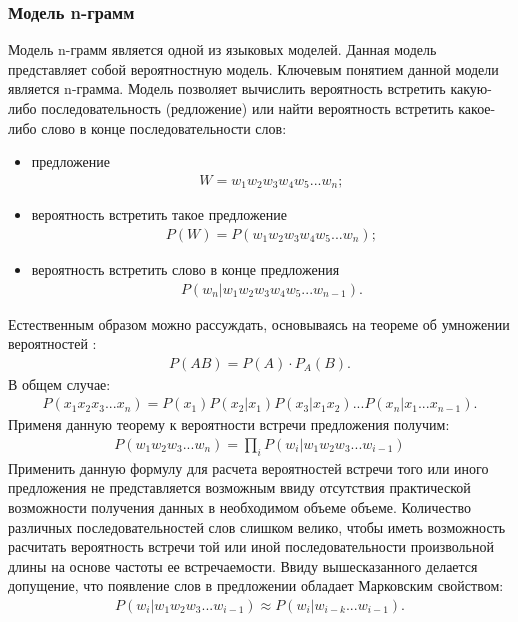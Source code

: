 \subsubsection{Модель n-грамм}
Модель n-грамм является одной из языковых моделей. Данная модель представляет собой вероятностную модель. Ключевым понятием данной модели является n-грамма. Модель позволяет вычислить вероятность встретить какую-либо последовательность (редложение) или найти вероятность встретить какое-либо слово в конце последовательности слов:
\begin{itemize}
	\item
	предложение
	\begin{align}
		W = w_1w_2w_3w_4w_5...w_n;
	\end{align}
	\item
	вероятность встретить такое предложение
	\begin{align}
		P(W) = P(w_1w_2w_3w_4w_5...w_n);
	\end{align}
	\item
	вероятность встретить слово в конце предложения
	\begin{align}
		P(w_n|w_1w_2w_3w_4w_5...w_{n-1}).
	\end{align}
\end{itemize}
Естественным образом можно рассуждать, основываясь на теореме об умножении вероятностей \cite{gmurman}:
\begin{align}
	P(AB) = P(A) \cdot P_A(B).
\end{align}
В общем случае:
\begin{align}
	P(x_1x_2x_3...x_n) = P(x_1)P(x_2|x_1)P(x_3|x_1x_2)...P(x_n|x_1...x_{n-1}).
\end{align}
Применя данную теорему к вероятности встречи предложения получим:
\begin{align}
	P(w_1w_2w_3...w_n) = \prod_{i}P(w_i|w_1w_2w_3...w_{i-1})
\end{align}
Применить данную формулу для расчета вероятностей встречи того или иного предложения не представляется возможным ввиду отсутствия практической возможности получения данных в необходимом объеме объеме. Количество различных последовательностей слов слишком велико, чтобы иметь возможность расчитать вероятность встречи той или иной последовательности произвольной длины на основе частоты ее встречаемости. Ввиду вышесказанного делается допущение, что появление слов в предложении обладает Марковским свойством:
\begin{align}
	P(w_i|w_1w_2w_3...w_{i-1}) \approx P(w_i|w_{i-k}...w_{i-1}).
\end{align}
